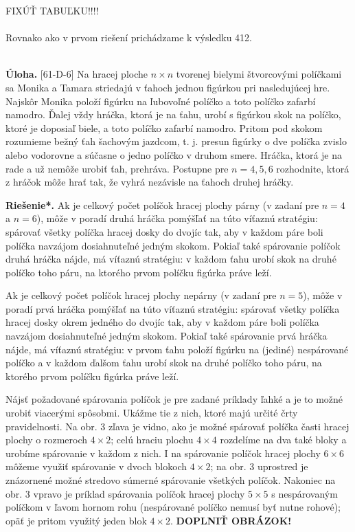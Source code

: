 \documentclass[11pt,a4paper,oneside,final]{book}
\newcommand{\ul}{\textbf{Úloha.} }
\newcommand{\rieh}{\textbf{Riešenie*.} }
\begin{document}
FIXÚŤ TABUĽKU!!!!\\
\\
Rovnako ako v prvom riešení prichádzame k výsledku 412.\\
\\
\begin{tcolorbox}[breakable,notitle,boxrule=0pt,colback=light-gray,colframe=light-gray]\ul [61-D-6]
Na hracej ploche $n \times n$ tvorenej bielymi štvorcovými políčkami sa Monika a Tamara striedajú v ťahoch jednou figúrkou pri nasledujúcej hre. Najskôr Monika položí figúrku na ľubovoľné políčko a toto políčko zafarbí namodro. Ďalej vždy hráčka, ktorá je na ťahu, urobí s figúrkou skok na políčko, ktoré je doposiaľ biele, a toto políčko zafarbí namodro. Pritom pod skokom rozumieme bežný ťah šachovým jazdcom, t. j. presun figúrky o dve políčka zvislo alebo vodorovne a súčasne o jedno políčko v druhom smere. Hráčka, ktorá je na rade a už nemôže urobiť ťah, prehráva. Postupne pre $n = 4, 5, 6$ rozhodnite, ktorá z hráčok môže hrať tak, že vyhrá nezávisle na ťahoch druhej hráčky.

\end{tcolorbox}

\rieh Ak je celkový počet políčok hracej plochy párny (v zadaní pre $n = 4$ a $n = 6$), môže v poradí druhá hráčka pomýšľať na túto víťaznú stratégiu: spárovať všetky políčka hracej dosky do dvojíc tak, aby v každom páre boli políčka navzájom dosiahnuteľné jedným skokom. Pokiaľ také spárovanie políčok druhá hráčka nájde, má víťaznú stratégiu: v každom ťahu urobí skok na druhé políčko toho páru, na ktorého prvom políčku figúrka práve leží.

Ak je celkový počet políčok hracej plochy nepárny (v zadaní pre $n = 5$), môže v poradí prvá hráčka pomýšľať na túto víťaznú stratégiu: spárovať všetky políčka hracej dosky okrem jedného do dvojíc tak, aby v každom páre boli políčka navzájom dosiahnuteľné jedným skokom. Pokiaľ také spárovanie prvá hráčka nájde, má víťaznú stratégiu: v prvom ťahu položí figúrku na (jediné) nespárované políčko a v každom
ďalšom ťahu urobí skok na druhé políčko toho páru, na ktorého prvom políčku figúrka práve leží.

Nájsť požadované spárovania políčok je pre zadané príklady ľahké a je to možné urobiť viacerými spôsobmi. Ukážme tie z nich, ktoré majú určité črty pravidelnosti. Na obr. 3 zľava je vidno, ako je možné spárovať políčka časti hracej plochy o rozmeroch $4\times2$; celú hraciu plochu $4 \times 4$ rozdelíme na dva také bloky a urobíme spárovanie v každom z nich. I na spárovanie políčok hracej plochy $6\times 6$ môžeme využiť spárovanie v dvoch blokoch $4 \times 2$; na obr. 3 uprostred je znázornené možné stredovo súmerné spárovanie všetkých políčok. Nakoniec na obr. 3 vpravo je príklad spárovania políčok hracej plochy $5 \times 5$ s nespárovaným políčkom v ľavom hornom rohu (nespárované políčko nemusí byť nutne rohové); opäť je pritom využitý jeden blok $4 \times 2$. \textbf{DOPLNIŤ OBRÁZOK!}\\
\\
\end{document}
